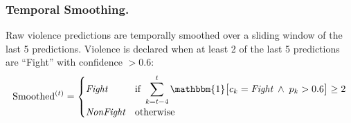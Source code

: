 \documentclass[11pt,a4paper]{article}
\begin{document}
\subsubsection{Temporal Smoothing.}
Raw violence predictions are temporally smoothed over a sliding window of the last 5 predictions. Violence is declared when at least 2 of the last 5 predictions are ``Fight'' with confidence $> 0.6$:
\begin{equation}
\text{Smoothed}^{(t)} = \begin{cases}
\textit{Fight} & \text{if } \displaystyle\sum_{k=t-4}^{t} \mathbbm{1}\bigl[c_k = \textit{Fight} \;\wedge\; p_k > 0.6\bigr] \geq 2 \\[6pt]
\textit{NonFight} & \text{otherwise}
\end{cases}
\label{eq:temporal_smooth}
\end{equation}
\end{document}
